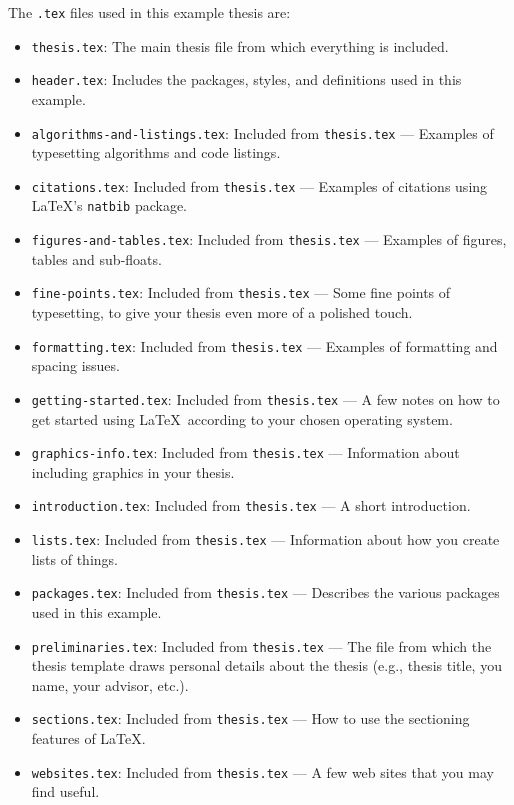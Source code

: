     The \verb|.tex| files used in this example thesis are:
    \begin{itemize}
	\item \verb|thesis.tex|: The main thesis file from which
	    everything is included. 
	\item \verb|header.tex|: Includes the packages, styles, and
	    definitions used in this example. 
	\item \verb|algorithms-and-listings.tex|: Included from
	    \verb|thesis.tex| --- Examples of typesetting algorithms and code
	    listings. 
	\item \verb|citations.tex|: Included from \verb|thesis.tex| ---
	    Examples of citations using \LaTeX's \verb|natbib| package. 
	\item \verb|figures-and-tables.tex|: Included from
	    \verb|thesis.tex| --- Examples of figures, tables and sub-floats. 
	\item \verb|fine-points.tex|: Included from \verb|thesis.tex| --- 
	    Some fine points of typesetting, to give your thesis even
	    more of a polished touch.
	\item \verb|formatting.tex|: Included from
	    \verb|thesis.tex| --- Examples of formatting and spacing issues. 
	\item \verb|getting-started.tex|: Included from
	    \verb|thesis.tex| --- A few notes on how to get started
	    using \LaTeX\ according to your chosen operating system.
	\item \verb|graphics-info.tex|: Included from
	    \verb|thesis.tex| --- Information about including graphics
		in your thesis.
	\item \verb|introduction.tex|: Included from \verb|thesis.tex|
	    --- A short introduction.
	\item \verb|lists.tex|: Included from \verb|thesis.tex| ---
	    Information about how you create lists of things.
	\item \verb|packages.tex|: Included from \verb|thesis.tex| ---
	    Describes the various packages used in this example. 
	\item \verb|preliminaries.tex|: Included from
	    \verb|thesis.tex| --- The file from which the thesis
	    template draws personal details about the thesis
	    (e.g., thesis title, you name, your advisor, etc.).
	\item \verb|sections.tex|: Included from \verb|thesis.tex| ---
	    How to use the sectioning features of \LaTeX.
	\item \verb|websites.tex|: Included from \verb|thesis.tex| --- A
	    few web sites that you may find useful.
    \end{itemize}
	
